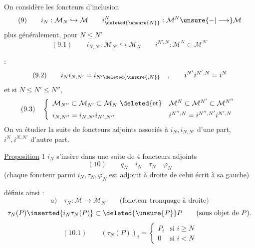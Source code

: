 On considère les foncteurs d'inclusion
\[
(9)\qquad i_N:\mathcal M_N\hookrightarrow\mathcal M\qquad
 i^N_{\deleted{\unsure{N}}}:\mathcal M^N\unsure{-|\longrightarrow}\mathcal M
\]
plus généralement, pour $N\leq N'$
\[
(9.1)\qquad i_{N,N'}:\mathcal M_{N'}\hookrightarrow\mathcal M_N\qquad
 i^{N',N}:\mathcal M^N\subset\mathcal M^{N'}
\]

 :
\[
(9.2)\qquad i_Ni_{N,N'}=i_{N'\deleted{\unsure{,N}}}\quad,\qquad
 i^{N'}i^{N',N}=i^N
\]
 et si $N\leq N'\leq N''$,\quad {} 
\[
(9.3)\quad\left\{\begin{array}{ll}
\mathcal M_{N''}\subset\mathcal M_{N'}\subset\mathcal M_N\ \deleted{\text{et}}&\mathcal M^N\subset\mathcal M^{N'}\subset\mathcal M^{N''}\\[1ex]
i_{N,N''}=i_{N,N'}i_{N',N''}&i^{N'',N}=i^{N'',N'}i^{N',N}
\end{array}\right.
\]
On va étudier la suite de foncteurs adjoints associés à $i_N,i_{N,N'}$ d'une part, $i^N,i^{N,N'}$ d'autre part.

\uline{Proposition} 1 $i_N$ s'insère dans une suite de 4 foncteurs adjoints
\[
(10)\qquad q_N\quad i_N\quad\tau_N\quad\varphi_N
\]
(chaque foncteur  parmi $i_N,\tau_N,\varphi_N$ est adjoint à droite de celui écrit à sa gauche)

définis ainsi :
\[
a)\quad\tau_N:\mathcal M\longrightarrow\mathcal M_N\qquad
\text{(foncteur tronquage à droite)}
\]
\[
\tau_N(P)\inserted{i_N\tau_N(P)}\subset\deleted{\unsure{P}}P\qquad\text{(sous objet de }P\text{)}.
\]
\[
(10.1)\qquad(\tau_N(P))_i=\left\{\begin{array}{ll}P_i&\text{si }i\geq N\\0&\text{si }i<N\end{array}\right.
\]
